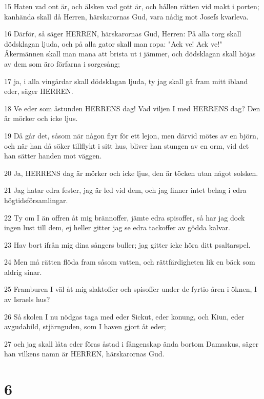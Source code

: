 \par 15 Haten vad ont är, och älsken vad gott är, och hållen rätten vid makt i porten; kanhända skall då Herren, härskarornas Gud, vara nådig mot Josefs kvarleva.
\par 16 Därför, så säger HERREN, härskarornas Gud, Herren: På alla torg skall dödsklagan ljuda, och på alla gator skall man ropa: "Ack ve! Ack ve!" Åkermännen skall man mana att brista ut i jämmer, och dödsklagan skall höjas av dem som äro förfarna i sorgesång;
\par 17 ja, i alla vingårdar skall dödsklagan ljuda, ty jag skall gå fram mitt ibland eder, säger HERREN.
\par 18 Ve eder som åstunden HERRENS dag! Vad viljen I med HERRENS dag? Den är mörker och icke ljus.
\par 19 Då går det, såsom när någon flyr för ett lejon, men därvid mötes av en björn, och när han då söker tillflykt i sitt hus, bliver han stungen av en orm, vid det han sätter handen mot väggen.
\par 20 Ja, HERRENS dag är mörker och icke ljus, den är töcken utan något solsken.
\par 21 Jag hatar edra fester, jag är led vid dem, och jag finner intet behag i edra högtidsförsamlingar.
\par 22 Ty om I än offren åt mig brännoffer, jämte edra spisoffer, så har jag dock ingen lust till dem, ej heller gitter jag se edra tackoffer av gödda kalvar.
\par 23 Hav bort ifrån mig dina sångers buller; jag gitter icke höra ditt psaltarspel.
\par 24 Men må rätten flöda fram såsom vatten, och rättfärdigheten lik en bäck som aldrig sinar.
\par 25 Framburen I väl åt mig slaktoffer och spisoffer under de fyrtio åren i öknen, I av Israels hus?
\par 26 Så skolen I nu nödgas taga med eder Sickut, eder konung, och Kiun, eder avgudabild, stjärnguden, som I haven gjort åt eder;
\par 27 och jag skall låta eder föras åstad i fångenskap ända bortom Damaskus, säger han vilkens namn är HERREN, härskarornas Gud.

\chapter{6}

